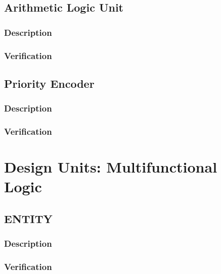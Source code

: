\documentclass[10pt,a4paper]{report}
\begin{document}
\pagebreak
\section{Arithmetic Logic Unit}
\subsection{Description}
\subsection{Verification}

\pagebreak
\section{Priority Encoder}
\subsection{Description}
\subsection{Verification}

\chapter{Design Units: Multifunctional Logic}

\section{ENTITY}

\subsection{Description}

%

\subsection{Verification}
\end{document}

